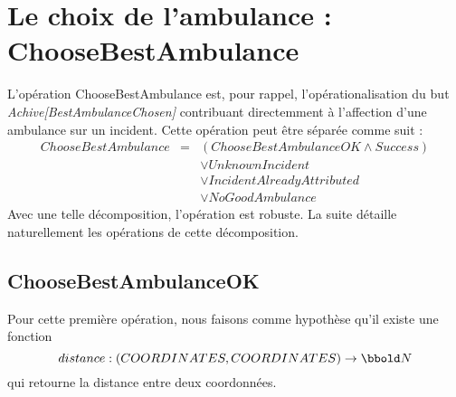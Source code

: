 \documentclass{report}
\begin{document}
\section{Le choix de l'ambulance : ChooseBestAmbulance}

L'opération ChooseBestAmbulance est, pour rappel, l'opérationalisation
du but \textit{Achive[BestAmbulanceChosen]} contribuant directemment à l'affection
d'une ambulance sur un incident. Cette opération
peut être séparée comme suit :
\begin{eqnarray*}
ChooseBestAmbulance & = & (ChooseBestAmbulanceOK \land Success) \\ && \lor
 UnknownIncident \\ && \lor IncidentAlreadyAttributed \\ && \lor NoGoodAmbulance
\end{eqnarray*}
Avec une telle décomposition, l'opération est robuste. La suite détaille 
naturellement les opérations de cette décomposition.

\subsection{ChooseBestAmbulanceOK}

Pour cette première opération, nous faisons comme hypothèse qu'il existe une
fonction $$distance : (COORDINATES, COORDINATES) \rightarrow \nat$$ qui retourne la 
distance entre deux coordonnées.
\end{document}
